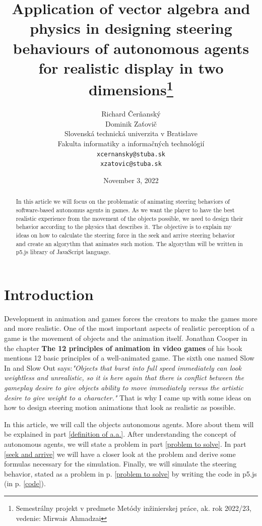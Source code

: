 \documentclass[10pt,twoside,english,a4paper]{article}
\title{Application of vector algebra and physics in 
designing steering behaviours of autonomous agents for 
realistic display in two dimensions\thanks{Semestrálny projekt v 
predmete Metódy inžinierskej práce, ak. rok 2022/23, 
vedenie: Mirwais Ahmadzai}}
\author{Richard Čerňanský\\
		Dominik Zaťovič\\[2pt]
	{\small Slovenská technická univerzita v Bratislave}\\
	{\small Fakulta informatiky a informačných technológií}\\
	{\small \texttt{xcernansky@stuba.sk}}\\
	{\small \texttt{xzatovic@stuba.sk}}
	}
\date{\small November 3, 2022 }
\begin{document}
\maketitle

\begin{abstract}

In this article we will focus on the problematic of animating steering 
behaviors of software-based autonomus agents in 
games. As we want the player to have the best realistic experience
from the movement of the objects possible, we need to design 
their behavior according to the physics that describes it. 
The objective is to explain my ideas on how to calculate the steering force 
in the seek and arrive steering behavior and create an algorythm
that animates such motion. The algorythm will be written
in p5.js library of JavaScript language. 

\end{abstract}

\section{Introduction}

Development in animation and games forces the creators to make 
the games more and more realistic. One of the most important 
aspects of realistic perception of a game is the movement of 
objects and the animation itself. Jonathan Cooper in the chapter 
\textbf{The 12 principles of animation in video games}\cite{Cooper} 
of his book mentions 12 basic principles of a well-animated game. 
The sixth one named Slow In and Slow Out says:\emph{"Objects that burst into full 
speed immediately can look weightless and unrealistic, so it is here 
again that there is conflict between the gameplay desire to give 
objects ability to move immediately versus the artistic desire to give weight 
to a character."} That is why I came up with some ideas on how to 
design steering motion animations that look as realistic as possible.

In this article, we will call the objects autonomous agents. 
More about them will be explained in part \ref{definition of a.a.}. 
After understanding the concept of autonomous agents, we will state 
a problem in part \ref{problem to solve}. In part \ref{seek and 
arrive} we will have a closer look at the problem and derive some 
formulas necessary for the simulation. Finally, we will simulate 
the steering behavior, stated as a problem in p. \ref{problem to 
solve} by writing the code in p5.js (in p. \ref{code}).
\end{document}
